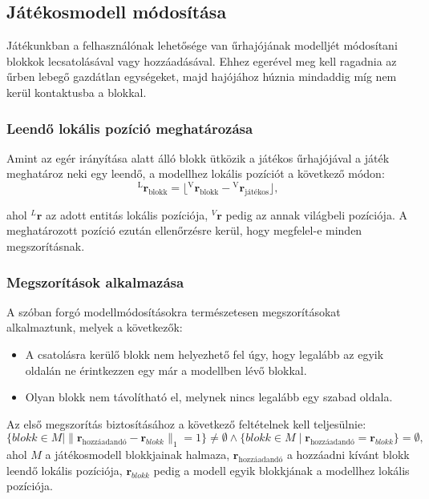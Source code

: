 \documentclass[12pt]{report}
\begin{document}
\newpage
\subsection{Játékosmodell módosítása}

Játékunkban a felhasználónak lehetősége van űrhajójának modelljét módosítani blokkok lecsatolásával vagy hozzáadásával. Ehhez egerével meg kell ragadnia az űrben lebegő gazdátlan egységeket, majd hajójához húznia mindaddig míg nem kerül kontaktusba a blokkal.

\subsubsection{Leendő lokális pozíció meghatározása}

Amint az egér irányítása alatt álló blokk ütközik a játékos űrhajójával a játék meghatároz neki egy leendő, a modellhez lokális pozíciót a következő módon:
\[
    {}^{\text{L}}\mathbf{r}_{\text{blokk}} = \lfloor {}^{\text{V}}\mathbf{r}_{\text{blokk}} - {}^{\text{V}}\mathbf{r}_{\text{játékos}} \rfloor,
\]

ahol ${}^L\mathbf{r}$ az adott entitás lokális pozíciója, ${}^V\mathbf{r}$ pedig az annak világbeli pozíciója. A meghatározott pozíció ezután ellenőrzésre kerül, hogy megfelel-e minden megszorításnak.

\subsubsection{Megszorítások alkalmazása}

A szóban forgó modellmódosításokra természetesen megszorításokat alkalmaztunk, melyek a következők:

\begin{itemize}
    \item A csatolásra kerülő blokk nem helyezhető fel úgy, hogy legalább az egyik oldalán ne érintkezzen egy már a modellben lévő blokkal.
    \item Olyan blokk nem távolítható el, melynek nincs legalább egy szabad oldala.
\end{itemize}

\noindent Az első megszorítás biztosításához a következő feltételnek kell teljesülnie:
\[
    \{ blokk \in M \mid \|\mathbf{r}_{\text{hozzáadandó}} - \mathbf{r}_{blokk}\|_1 = 1 \} \neq \emptyset
    \wedge
    \{ blokk \in M \mid \mathbf{r}_{\text{hozzáadandó}} = \mathbf{r}_{blokk} \} = \emptyset,
\]
ahol $M$ a játékosmodell blokkjainak halmaza, $\mathbf{r}_{\text{hozzáadandó}}$ a hozzáadni kívánt blokk leendő lokális pozíciója, $\mathbf{r}_{blokk}$ pedig a modell egyik blokkjának a modellhez lokális pozíciója.
\end{document}

